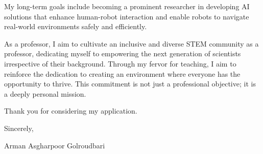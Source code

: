 \documentclass[a4,20pt]{article}
\begin{document}
\begin{large}
My long-term goals include becoming a prominent researcher in developing AI solutions that enhance human-robot interaction and enable robots to navigate real-world environments safely and efficiently.

As a professor, I aim to cultivate an inclusive and diverse STEM community as a professor, dedicating myself to empowering the next generation of scientists irrespective of their background. Through my fervor for teaching, I aim to reinforce the dedication to creating an environment where everyone has the opportunity to thrive. This commitment is not just a professional objective; it is a deeply personal mission.


Thank you for considering my application.

Sincerely,

Arman Asgharpoor Golroudbari


\end{large}
\end{document}
